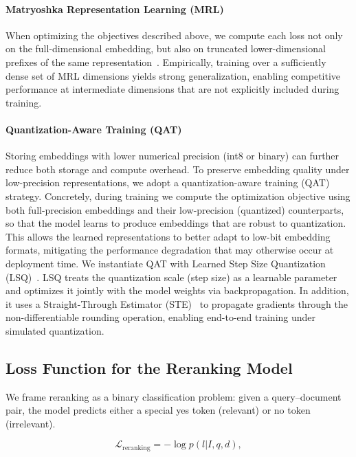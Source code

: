 \documentclass{article} %
\begin{document}
\paragraph{Matryoshka Representation Learning (MRL)}
When optimizing the objectives described above, we compute each loss not only on the full-dimensional embedding, but also on truncated lower-dimensional prefixes of the same representation~\citep{kusupati2022matryoshka}. Empirically, training over a sufficiently dense set of MRL dimensions yields strong generalization, enabling competitive performance at intermediate dimensions that are not explicitly included during training.

\paragraph{Quantization-Aware Training (QAT)}
Storing embeddings with lower numerical precision (int8 or binary) can further reduce both storage and compute overhead. To preserve embedding quality under low-precision representations, we adopt a quantization-aware training (QAT) strategy. Concretely, during training we compute the optimization objective using both full-precision embeddings and their low-precision (quantized) counterparts, so that the model learns to produce embeddings that are robust to quantization. This allows the learned representations to better adapt to low-bit embedding formats, mitigating the performance degradation that may otherwise occur at deployment time. 
We instantiate QAT with Learned Step Size Quantization (LSQ)~\citep{esser2020learned}. LSQ treats the quantization scale (step size) as a learnable parameter and optimizes it jointly with the model weights via backpropagation. In addition, it uses a Straight-Through Estimator (STE)~\citep{bengio2013estimating} to propagate gradients through the non-differentiable rounding operation, enabling end-to-end training under simulated quantization.


\subsection{Loss Function for the Reranking Model}
We frame reranking as a binary classification problem: given a query–document pair, the model predicts either a special yes token (relevant) or no token (irrelevant).

\begin{equation}
\label{loss:reranking}
        \mathcal{L}_\textrm{reranking} = -\log p(l|I,q,d),
\end{equation}
\end{document}
